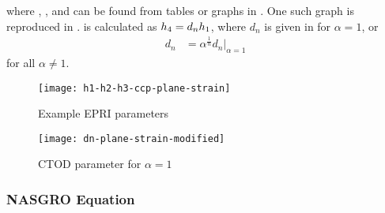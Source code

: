 where \hone, \htwo, and \hthree can be found from tables or graphs in \cite{epri1981}.
One such graph is reproduced in .
\hfour is calculated as \(h_4 = d_n h_1\), where \(d_n\) is given in  for \(\alpha=1\), or
\begin{align}
d_n &= \alpha^{\frac{1}{n}} \left. d_n \right|_{\alpha=1}
\end{align}
for all \(\alpha \neq 1\).
\begin{figure}
\centering
\texttt{[image: h1-h2-h3-ccp-plane-strain]}
\caption{\label{fig:h1-h2-h3-ccp-plane-strain} Example EPRI parameters}
\end{figure}
\begin{figure}
\centering
\texttt{[image: dn-plane-strain-modified]}
\caption[CTOD parameter for \(\alpha=1\)]{\label{fig:dn-plane-strain} CTOD parameter for \(\alpha=1\) \citep{epri1981}}
\end{figure}

\subsubsection{NASGRO Equation}

